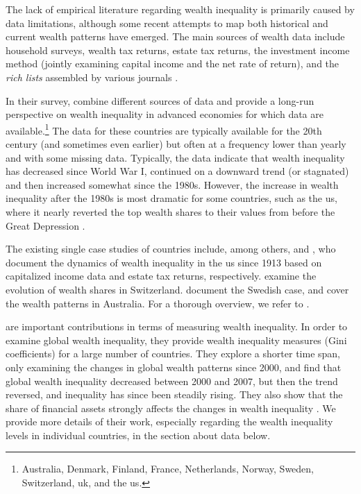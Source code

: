 \documentclass[a4paper,11pt]{article}
\begin{document}
The lack of empirical literature regarding wealth inequality is primarily caused by data limitations, although some recent attempts to map both historical and current wealth patterns have emerged. The main sources of wealth data include household surveys, wealth tax returns, estate tax returns, the investment income method (jointly examining capital income and the net rate of return), and the \textit{rich lists} assembled by various journals \citep{davies2000distribution}. 

In their survey, \citet{roine2015long} combine different sources of data and provide a long-run perspective on wealth inequality in advanced economies for which data are available.\footnote{Australia, Denmark, Finland, France, Netherlands, Norway, Sweden, Switzerland, \ac{uk}, and the \ac{us}.} The data for these countries are typically available for the 20th century (and sometimes even earlier) but often at a frequency lower than yearly and with some missing data. Typically, the data indicate that wealth inequality has decreased since World War I, continued on a downward trend (or stagnated) and then increased somewhat since the 1980s. However, the increase in wealth inequality after the 1980s is most dramatic for some countries, such as the \ac{us}, where it nearly reverted the top wealth shares to their values from before the Great Depression \citep{piketty2014}. 

The existing single case studies of countries include, among others, \citet{SaezZucman2016} and \citet{kopczuksaez2004}, who document the dynamics of wealth inequality in the \ac{us} since 1913 based on capitalized income data and estate tax returns, respectively. \citet{dell2007income} examine the evolution of wealth shares in Switzerland. \citet{roine2009wealth} document the Swedish case, and \citet{katic2016top} cover the wealth patterns in Australia. For a thorough overview, we refer to \citet{roine2015long}.

\citet{daviesetal2017,daviesetal2011,davies2000distribution} are important contributions in terms of measuring wealth inequality. In order to examine global wealth inequality, they provide wealth inequality measures (Gini coefficients) for a large number of countries. They explore a shorter time span, only examining the changes in global wealth patterns since 2000, and find that global wealth inequality decreased between 2000 and 2007, but then the trend reversed, and inequality has since been steadily rising. They also show that the share of financial assets strongly affects the changes in wealth inequality \citep{daviesetal2017}. We provide more details of their work, especially regarding the wealth inequality levels in individual countries, in the section about data below.
\end{document}
